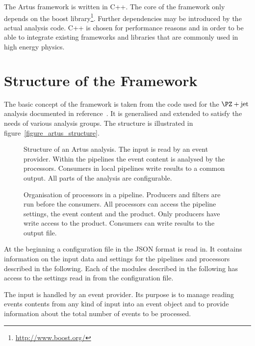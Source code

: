 \documentclass[3p]{elsarticle}
\begin{document}
The Artus framework is written in C++. The core of the framework only depends on the boost library\footnote{\url{http://www.boost.org/}}. Further dependencies may be introduced by the actual analysis code. C++ is chosen for performance reasons and in order to be able to integrate existing frameworks and libraries that are commonly used in high energy physics.


\section{Structure of the Framework \label{section_artus_structure}}

The basic concept of the framework is taken from the code used for the $\PZ+\text{jet}$ analysis documented in reference~\cite{joram_phd}. It is generalised and extended to satisfy the needs of various analysis groups. The structure is illustrated in figure~\ref{figure_artus_structure}.

\begin{figure}[p]
\centering 
\caption[Structure of an Artus analysis.]{Structure of an Artus analysis. The input is read by an event provider. Within the pipelines the event content is analysed by the processors. Consumers in local pipelines write results to a common output. All parts of the analysis are configurable.}
\label{figure_artus_structure}

\vspace{10ex}

\centering 
\caption[Organisation of processors in a pipeline.]{Organisation of processors in a pipeline. Producers and filters are run before the consumers. All processors can access the pipeline settings, the event content and the product. Only producers have write access to the product. Consumers can write results to the output file.}
\label{figure_artus_pipeline}
\end{figure}

At the beginning a configuration file in the JSON format is read in. It contains information on the input data and settings for the pipelines and processors described in the following. Each of the modules described in the following has access to the settings read in from the configuration file.

The input is handled by an event provider. Its purpose is to manage reading events contents from any kind of input into an event object and to provide information about the total number of events to be processed.
\end{document}
